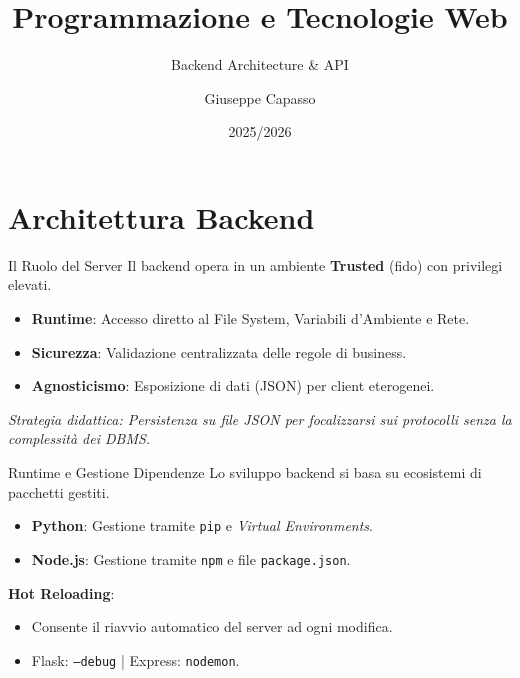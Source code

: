 \documentclass[10pt]{beamer}
\title[Lezione 4]{Programmazione e Tecnologie Web}
\subtitle{Backend Architecture \& API}
\author{Giuseppe Capasso}
\date{2025/2026}
\begin{document}
\begin{frame}
    \titlepage
\end{frame}

\section{Architettura Backend}
\begin{frame}{Il Ruolo del Server}
    Il backend opera in un ambiente \textbf{Trusted} (fido) con privilegi elevati.
    \begin{itemize}
        \item \textbf{Runtime}: Accesso diretto al File System, Variabili d'Ambiente e Rete.
        \item \textbf{Sicurezza}: Validazione centralizzata delle regole di business.
        \item \textbf{Agnosticismo}: Esposizione di dati (JSON) per client eterogenei.
    \end{itemize}
    \vspace{0.2cm}
    \textit{Strategia didattica: Persistenza su file JSON per focalizzarsi sui protocolli senza la complessità dei DBMS.}
\end{frame}

\begin{frame}{Runtime e Gestione Dipendenze}
    Lo sviluppo backend si basa su ecosistemi di pacchetti gestiti.
    \begin{itemize}
        \item \textbf{Python}: Gestione tramite \texttt{pip} e \textit{Virtual Environments}.
        \item \textbf{Node.js}: Gestione tramite \texttt{npm} e file \texttt{package.json}.
    \end{itemize}
    \vspace{0.3cm}
    \textbf{Hot Reloading}:
    \begin{itemize}
        \item Consente il riavvio automatico del server ad ogni modifica.
        \item Flask: \texttt{--debug} | Express: \texttt{nodemon}.
    \end{itemize}
\end{frame}
\end{document}
